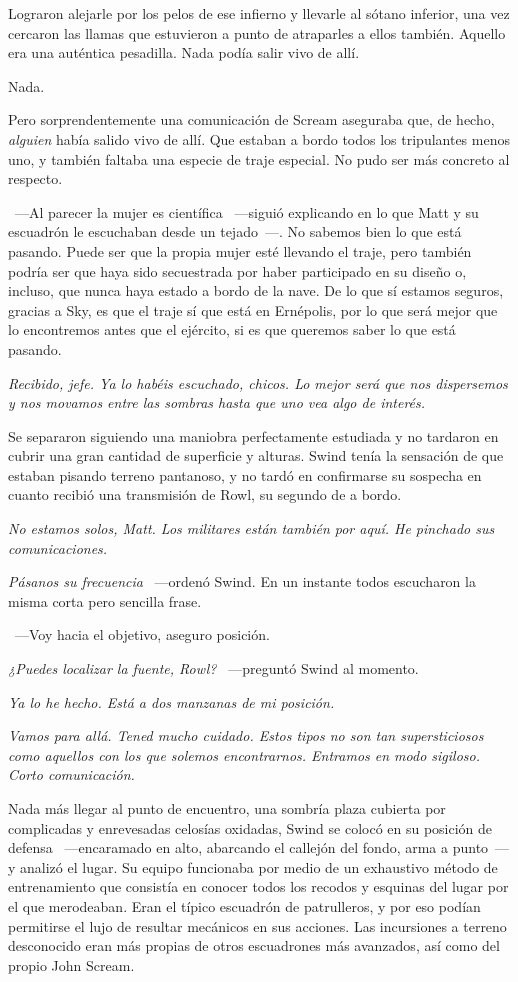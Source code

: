 Lograron alejarle por los pelos de ese infierno y llevarle al sótano inferior, una vez cercaron las llamas que estuvieron a punto de atraparles a ellos también. Aquello era una auténtica pesadilla. Nada podía salir vivo de allí.

Nada.

Pero sorprendentemente una comunicación de Scream aseguraba que, de hecho, \emph{alguien} había salido vivo de allí. Que estaban a bordo todos los tripulantes menos uno, y también faltaba una especie de traje especial. No pudo ser más concreto al respecto.

~---Al parecer la mujer es científica ~---siguió explicando en lo que Matt y su escuadrón le escuchaban desde un tejado~---. No sabemos bien lo que está pasando. Puede ser que la propia mujer esté llevando el traje, pero también podría ser que haya sido secuestrada por haber participado en su diseño o, incluso, que nunca haya estado a bordo de la nave. De lo que sí estamos seguros, gracias a Sky, es que el traje sí que está en Ernépolis, por lo que será mejor que lo encontremos antes que el ejército, si es que queremos saber lo que está pasando.

\emph{Recibido, jefe. Ya lo habéis escuchado, chicos. Lo mejor será que nos dispersemos y nos movamos entre las sombras hasta que uno vea algo de interés.}

Se separaron siguiendo una maniobra perfectamente estudiada y no tardaron en cubrir una gran cantidad de superficie y alturas. Swind tenía la sensación de que estaban pisando terreno pantanoso, y no tardó en confirmarse su sospecha en cuanto recibió una transmisión de Rowl, su segundo de a bordo.

\emph{No estamos solos, Matt. Los militares están también por aquí. He pinchado sus comunicaciones.}

\emph{Pásanos su frecuencia} ~---ordenó Swind. En un instante todos escucharon la misma corta pero sencilla frase.

~---Voy hacia el objetivo, aseguro posición.

\emph{¿Puedes localizar la fuente, Rowl?} ~---preguntó Swind al momento.

\emph{Ya lo he hecho. Está a dos manzanas de mi posición.}

\emph{Vamos para allá. Tened mucho cuidado. Estos tipos no son tan supersticiosos como aquellos con los que solemos encontrarnos. Entramos en modo sigiloso. Corto comunicación.}

Nada más llegar al punto de encuentro, una sombría plaza cubierta por complicadas y enrevesadas celosías oxidadas, Swind se colocó en su posición de defensa ~---encaramado en alto, abarcando el callejón del fondo, arma a punto~--- y analizó el lugar. Su equipo funcionaba por medio de un exhaustivo método de entrenamiento que consistía en conocer todos los recodos y esquinas del lugar por el que merodeaban. Eran el típico escuadrón de patrulleros, y por eso podían permitirse el lujo de resultar mecánicos en sus acciones. Las incursiones a terreno desconocido eran más propias de otros escuadrones más avanzados, así como del propio John Scream.

